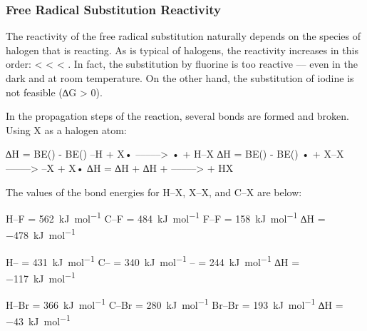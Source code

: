 

	\subsubsection{Free Radical Substitution Reactivity}

		The reactivity of the free radical substitution naturally depends on the species of halogen that is reacting.
		As is typical of halogens, the reactivity increases in this order:  <  <  < .
		In fact, the substitution by fluorine is too reactive –– even in the dark and at room temperature. On the other hand,
		the substitution of iodine is not feasible (∆G > 0).

		In the propagation steps of the reaction, several bonds are formed and broken. Using X as a halogen atom:

		\vspace{1em}
		\vbox{∆H = BE() - BE()		\tabto{60mm}–H + X•		\tabto{85mm} –––––> • + H–X	}
		\vbox{∆H = BE() - BE()		\tabto{60mm}• + X–X		\tabto{85mm} –––––> –X + X•	}
		\vbox{∆H = ∆H + ∆H	\tabto{60mm} + 	\tabto{85mm} –––––>  + HX	}

		The values of the bond energies for H–X, X–X, and C–X are below:
		\vspace{1.0em}

		\vbox{
					\tabto{25mm}	H–F			\tabto{50mm} = \SI{562}{\kilo\joule\per\mole}
						\tabto{25mm}	C–F			\tabto{50mm} = \SI{484}{\kilo\joule\per\mole}
						\tabto{25mm}	F–F			\tabto{50mm} = \SI{158}{\kilo\joule\per\mole}
						\tabto{25mm}	∆H	\tabto{50mm} = \SI{-478}{\kilo\joule\per\mole}
		}

		\vspace{1.0em}
		\vbox{
				\tabto{25mm}	H–\ch{\chlorine}				\tabto{50mm} = \SI{431}{\kilo\joule\per\mole}
							\tabto{25mm}	C–\ch{\chlorine}				\tabto{50mm} = \SI{340}{\kilo\joule\per\mole}
							\tabto{25mm}	\ch{\chlorine}–	\tabto{50mm} = \SI{244}{\kilo\joule\per\mole}
							\tabto{25mm}	∆H						\tabto{50mm} = \SI{-117}{\kilo\joule\per\mole}
		}

		\vspace{1.0em}
		\vbox{
				\tabto{25mm}	H–Br		\tabto{50mm} = \SI{366}{\kilo\joule\per\mole}
						\tabto{25mm}	C–Br		\tabto{50mm} = \SI{280}{\kilo\joule\per\mole}
						\tabto{25mm}	Br–Br		\tabto{50mm} = \SI{193}{\kilo\joule\per\mole}
						\tabto{25mm}	∆H	\tabto{50mm} = \SI{-43}{\kilo\joule\per\mole}
		}

